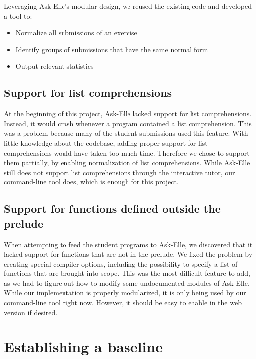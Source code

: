 \documentclass[a4paperpaper,]{report}
\providecommand{\tightlist}{%
  \setlength{\itemsep}{0pt}\setlength{\parskip}{0pt}}
\begin{document}
Leveraging Ask-Elle's modular design, we reused the existing code and
developed a tool to:

\begin{itemize}
\tightlist
\item
  Normalize all submissions of an exercise
\item
  Identify groups of submissions that have the same normal form
\item
  Output relevant statistics
\end{itemize}

\hypertarget{support-for-list-comprehensions}{%
\subsection{Support for list
comprehensions}\label{support-for-list-comprehensions}}

At the beginning of this project, Ask-Elle lacked support for list
comprehensions. Instead, it would crash whenever a program contained a
list comprehension. This was a problem because many of the student
submissions used this feature. With little knowledge about the codebase,
adding proper support for list comprehensions would have taken too much
time. Therefore we chose to support them partially, by enabling
normalization of list comprehensions. While Ask-Elle still does not
support list comprehensions through the interactive tutor, our
command-line tool does, which is enough for this project.

\hypertarget{support-for-functions-defined-outside-the-prelude}{%
\subsection{Support for functions defined outside the
prelude}\label{support-for-functions-defined-outside-the-prelude}}

When attempting to feed the student programs to Ask-Elle, we discovered
that it lacked support for functions that are not in the prelude. We
fixed the problem by creating special compiler options, including the
possibility to specify a list of functions that are brought into scope.
This was the most difficult feature to add, as we had to figure out how
to modify some undocumented modules of Ask-Elle. While our
implementation is properly modularized, it is only being used by our
command-line tool right now. However, it should be easy to enable in the
web version if desired.

\hypertarget{establishing-a-baseline}{%
\section{Establishing a baseline}\label{establishing-a-baseline}}
\end{document}
